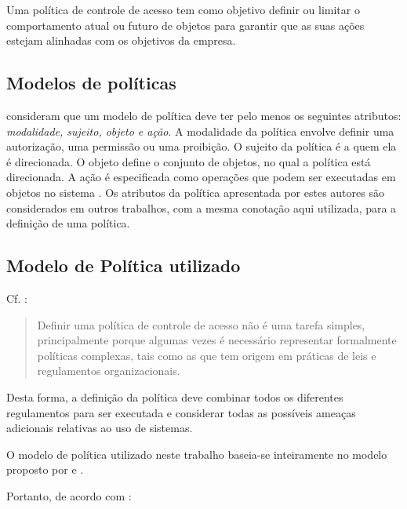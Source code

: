 Uma política de controle de acesso tem como objetivo definir ou limitar o comportamento atual ou futuro de objetos para garantir que as suas ações estejam alinhadas com os objetivos da empresa.\cite{dunlop_dynamic_2002}\cite{sarkis2017}



\subsection{Modelos de políticas}\label{modelo_politicas}
\cite{moffett_policy_1994} consideram que um modelo de política deve ter pelo menos os seguintes atributos: \textit{modalidade, sujeito, objeto e ação}. A modalidade da política envolve definir uma autorização, uma permissão ou uma proibição. O sujeito da política é a quem ela é direcionada. O objeto define o conjunto de objetos, no qual a política está direcionada. A ação é especificada como operações que podem ser executadas em objetos no sistema \cite{moffett_policy_1994}. Os atributos da política apresentada por estes autores são considerados em outros trabalhos, com a mesma conotação aqui utilizada, para a definição de uma política.\cite{sarkis2017}

\subsection{Modelo de Política utilizado}\label{modelo_politica_utilizada}
Cf. \cite{sarkis2017}:

\begin{quotation}
	Definir uma política de controle de acesso não é uma tarefa simples, principalmente porque algumas vezes é necessário representar formalmente políticas complexas, tais como as que tem origem em práticas de leis e regulamentos organizacionais.
\end{quotation} 

Desta forma, a definição da política deve combinar todos os diferentes regulamentos para ser executada e considerar todas as possíveis ameaças adicionais relativas ao uso de sistemas. \cite{di_vimercati_policies_2005}

O modelo de política utilizado neste trabalho baseia-se inteiramente no modelo proposto por \cite{sarkis2017} e \cite{sarkis:artigo:2016}.

Portanto, de acordo com \cite[p.36]{sarkis2017}:

